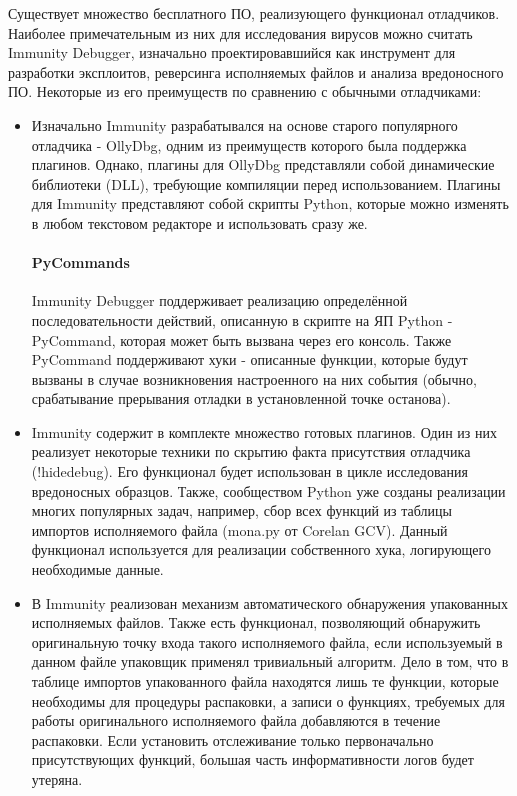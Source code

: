 Существует множество бесплатного ПО, реализующего функционал отладчиков. Наиболее примечательным из них для исследования вирусов можно считать Immunity Debugger, изначально проектировавшийся как инструмент для разработки эксплоитов, реверсинга исполняемых файлов и анализа вредоносного ПО. Некоторые из его преимуществ по сравнению с обычными отладчиками:
\begin {itemize}
	\item Изначально Immunity разрабатывался на основе старого популярного отладчика - OllyDbg, одним из преимуществ которого была поддержка плагинов. Однако, плагины для OllyDbg представляли собой динамические библиотеки (DLL), требующие компиляции перед использованием. Плагины для Immunity представляют собой скрипты Python, которые можно изменять в любом текстовом редакторе и использовать сразу же.
	\paragraph {PyCommands}
Immunity Debugger поддерживает реализацию определённой последовательности действий, описанную в скрипте на ЯП Python - PyCommand, которая может быть вызвана через его консоль. Также PyCommand поддерживают хуки - описанные функции, которые будут вызваны в случае возникновения настроенного на них события (обычно, срабатывание прерывания отладки в установленной точке останова).
	\item Immunity содержит в комплекте множество готовых плагинов. Один из них реализует некоторые техники по скрытию факта присутствия отладчика (!hidedebug). Его функционал будет использован в цикле исследования вредоносных образцов. Также, сообществом Python уже созданы реализации многих популярных задач, например, сбор всех функций из таблицы импортов исполняемого файла (mona.py от Corelan GCV). Данный функционал используется для реализации собственного хука, логирующего необходимые данные.
	\item В Immunity реализован механизм автоматического обнаружения упакованных исполняемых файлов. Также есть функционал, позволяющий обнаружить оригинальную точку входа такого исполняемого файла, если используемый в данном файле упаковщик применял тривиальный алгоритм. Дело в том, что в таблице импортов упакованного файла находятся лишь те функции, которые необходимы для процедуры распаковки, а записи о функциях, требуемых для работы оригинального исполняемого файла добавляются в течение распаковки. Если установить отслеживание только первоначально присутствующих функций, большая часть информативности логов будет утеряна.
\end {itemize}

